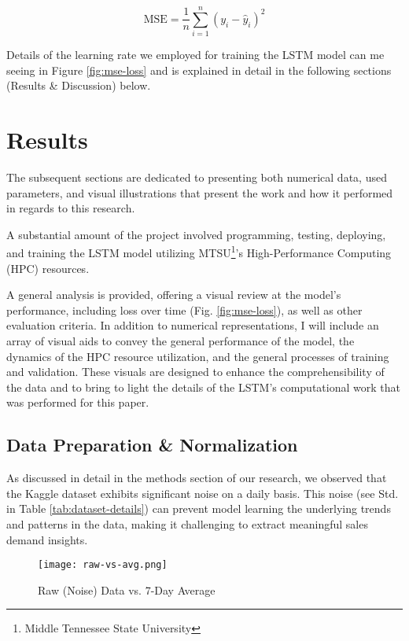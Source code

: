 \documentclass[10pt, conference, compsoc]{IEEEtran}
\begin{document}
\begin{equation}
\text{MSE} = \frac{1}{n} \sum_{i=1}^{n} (y_i - \hat{y}_i)^2
\label{eq:mse}
\end{equation}

Details of the learning rate we employed for training the LSTM model can me seeing in Figure \ref{fig:mse-loss} and is explained in detail in the following sections (Results \& Discussion) below.


\section{Results}
The subsequent sections are dedicated to presenting both numerical data, used parameters, and visual illustrations that present the work and how it performed in regards to this research.

A substantial amount of the project involved programming, testing, deploying, and training the LSTM model utilizing MTSU\footnote{Middle Tennessee State University}'s High-Performance Computing (HPC) resources.

A general analysis is provided, offering a visual review at the model's performance, including loss over time (Fig. \ref{fig:mse-loss}), as well as other evaluation criteria. In addition to numerical representations, I will include an array of visual aids to convey the general performance of the model, the dynamics of the HPC resource utilization, and the general processes of training and validation. These visuals are designed to enhance the comprehensibility of the data and to bring to light the details of the LSTM's computational work that was performed for this paper.


\subsection{Data Preparation \& Normalization}
As discussed in detail in the methods section of our research, we observed that the Kaggle dataset\cite{demand-forecasting-kernels-only} exhibits significant noise on a daily basis. This noise (see Std. in Table \ref{tab:dataset-details}) can prevent model learning the underlying trends and patterns in the data, making it challenging to extract meaningful sales demand insights.

\begin{figure}[h]
\centering
\captionsetup{justification=centering,margin=1cm}
\texttt{[image: raw-vs-avg.png]}
\caption{Raw (Noise) Data vs. 7-Day Average}
\label{fig:raw-vs-avg}
\end{figure}
\end{document}
